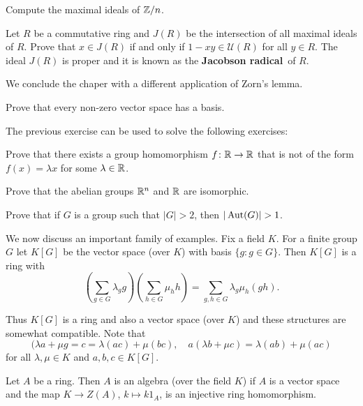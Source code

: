 \begin{exercise}
	Compute the maximal ideals of $\mathbb{Z}/n$. 	
\end{exercise}

\begin{exercise}
	Let $R$ be a commutative ring and $J(R)$ be the intersection of all maximal ideals 
	of $R$. Prove that $x\in J(R)$ 
	if and only if $1-xy\in\mathcal{U}(R)$ for all $y\in R$. The ideal $J(R)$ is proper
	and it is known
	as the \textbf{Jacobson radical} of $R$.  	
\end{exercise}

We conclude the chaper with a different application of Zorn's lemma.  

\begin{exercise}
	Prove that every non-zero vector space has a basis.
\end{exercise}

The previous exercise can be used to solve the following exercises:

\begin{exercise}
    Prove that there exists a group homomorphism $f\colon\mathbb{R}\to\mathbb{R}$ that 
    is not of the form $f(x)=\lambda x$ for some $\lambda\in\mathbb{R}$. 
\end{exercise}

\begin{exercise}
    Prove that the abelian groups $\mathbb{R}^n$ and $\mathbb{R}$ are isomorphic.
\end{exercise}

\begin{exercise}
    Prove that if $G$ is a group such that $|G|>2$, then $|\Aut(G)|>1$.
\end{exercise}

We now discuss an important family of examples. 
Fix a field $K$. 
For a finite group $G$ let $K[G]$ be the vector space (over $K$)
with basis $\{g:g\in G\}$. Then $K[G]$ is a ring
with
\[
\left(\sum_{g\in G}\lambda_gg\right)\left(\sum_{h\in G}\mu_hh\right)
=\sum_{g,h\in G}\lambda_g\mu_h(gh).
\] 

Thus $K[G]$ is a ring and also a vector space (over $K$) and these structures
are somewhat compatible. Note that
\[
(\lambda a+\mu g=c=\lambda (ac)+\mu (bc),\quad
a(\lambda b+\mu c)=\lambda (ab)+\mu (ac)
\]
for all $\lambda,\mu\in K$ and $a,b,c\in K[G]$. 

\begin{definition}
Let $A$ be a ring. Then $A$ is an algebra (over the field $K$) if $A$ is a vector space
and the map $K\to Z(A)$, $k\mapsto k1_A$, is an injective ring homomorphism.  
\end{definition}


